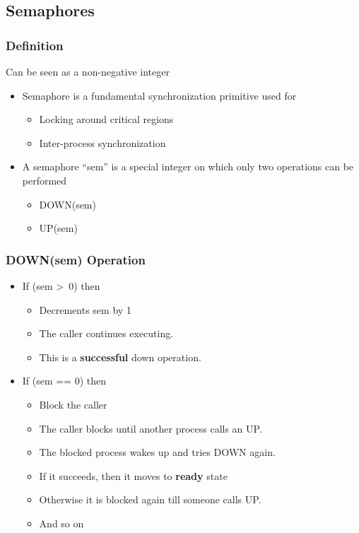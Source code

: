 \documentclass[12pt]{article}
\begin{document}
\subsection{Semaphores}
\subsubsection{Definition}
Can be seen as a non-negative integer
\begin{itemize}
    \item Semaphore is a fundamental synchronization primitive used for \begin{itemize}
        \item Locking around critical regions 
        \item Inter-process synchronization
    \end{itemize}
    \item A semaphore “sem” is a special integer on which only two operations can be performed \begin{itemize}
        \item DOWN(sem)
        \item UP(sem)
    \end{itemize}
\end{itemize}
\subsubsection{DOWN(sem) Operation}
\begin{itemize}
    \item If (sem \textgreater \ 0) then \begin{itemize}
        \item Decrements sem by 1 
        \item The caller continues executing. 
        \item This is a {\bfseries successful} down operation.
    \end{itemize}
    \item If (sem == 0) then \begin{itemize}
        \item Block the caller 
        \item The caller blocks until another process calls an UP. 
        \item The blocked process wakes up and tries DOWN again. 
        \item If it succeeds, then it moves to {\bfseries ready} state 
        \item Otherwise it is blocked again till someone calls UP. 
        \item And so on
    \end{itemize}
\end{itemize}
\end{document}
